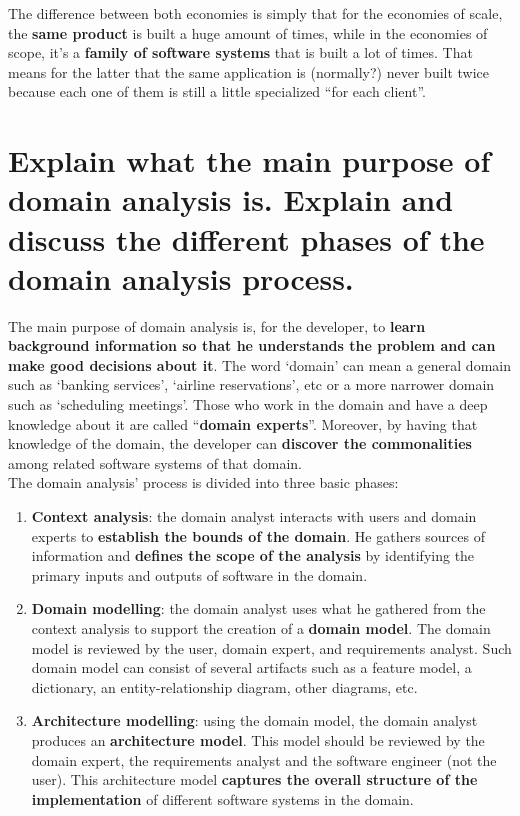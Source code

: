 The difference between both economies is simply that for the economies of scale, the \textbf{same product} is built a huge amount of times, while in the economies of scope, it’s a \textbf{family of software systems} that is built a lot of times. That means for the latter that the same application is (normally?) never built twice because each one of them is still a little specialized “for each client”.

\section{Explain what the main purpose of domain analysis is.
Explain and discuss the different phases of the domain analysis process.}

The main purpose of domain analysis is, for the developer, to \textbf{learn background information so that he understands the problem and can make good decisions about it}. The word ‘domain’ can mean a general domain such as ‘banking services’, ‘airline reservations’, etc or a more narrower domain such as ‘scheduling meetings’. Those who work in the domain and have a deep knowledge about it are called “\textbf{domain experts}”. Moreover, by having that knowledge of the domain, the developer can \textbf{discover the commonalities} among related software systems of that domain.\\

The domain analysis’ process is divided into three basic phases:
\begin{enumerate}
\item \textbf{Context analysis}: the domain analyst interacts with users and domain experts to \textbf{establish the bounds of the domain}. He gathers sources of information and \textbf{defines the scope of the analysis} by identifying the primary inputs and outputs of software in the domain.
\item \textbf{Domain modelling}: the domain analyst uses what he gathered from the context analysis to support the creation of a \textbf{domain model}. The domain model is reviewed by the user, domain expert, and requirements analyst. Such domain model can consist of several artifacts such as a feature model, a dictionary, an entity-relationship diagram, other diagrams, etc.
\item \textbf{Architecture modelling}: using the domain model, the domain analyst produces an \textbf{architecture model}. This model should be reviewed by the domain expert, the requirements analyst and the software engineer (not the user). This architecture model \textbf{captures the overall structure of the implementation} of different software systems in the domain.
\end{enumerate}

